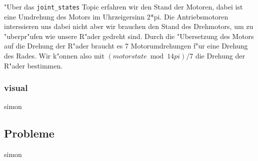 \documentclass[8pt]{article}
\begin{document}
"Uber das \texttt{joint\_states} Topic erfahren wir den Stand der Motoren, dabei ist eine Umdrehung des Motors im Uhrzeigersinn 2*pi. Die Antriebsmotoren interssieren uns dabei nicht aber wir brauchen den Stand des Drehmotors, um zu "uberpr"ufen wie unsere R"ader gedreht sind. Durch die "Ubersetzung des Motors auf die Drehung der R"ader braucht es 7 Motorumdrehungen f"ur eine Drehung des Rades. Wir k"onnen also mit 
\( (motorstate \bmod 14pi) / 7 \) die Drehung der R"ader bestimmen.

\subsubsection{visual} simon

\subsection{Probleme} simon
\end{document}
